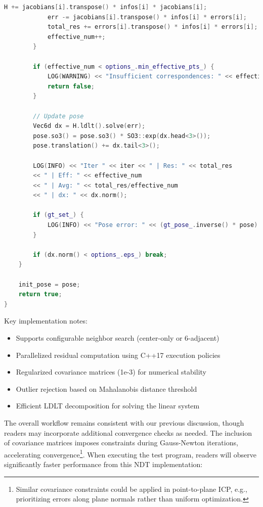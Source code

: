 \begin{lstlisting}[language=c++,caption=src/ch7/ndt\_3d.cc]
			H += jacobians[i].transpose() * infos[i] * jacobians[i];
			err -= jacobians[i].transpose() * infos[i] * errors[i];
			total_res += errors[i].transpose() * infos[i] * errors[i];
			effective_num++;
		}
		
		if (effective_num < options_.min_effective_pts_) {
			LOG(WARNING) << "Insufficient correspondences: " << effective_num;
			return false;
		}
		
		// Update pose
		Vec6d dx = H.ldlt().solve(err);
		pose.so3() = pose.so3() * SO3::exp(dx.head<3>());
		pose.translation() += dx.tail<3>();
		
		LOG(INFO) << "Iter " << iter << " | Res: " << total_res 
		<< " | Eff: " << effective_num
		<< " | Avg: " << total_res/effective_num
		<< " | dx: " << dx.norm();
		
		if (gt_set_) {
			LOG(INFO) << "Pose error: " << (gt_pose_.inverse() * pose).log().norm();
		}
		
		if (dx.norm() < options_.eps_) break;
	}
	
	init_pose = pose;
	return true;
}
\end{lstlisting}

Key implementation notes:
\begin{itemize}
	\item Supports configurable neighbor search (center-only or 6-adjacent)
	\item Parallelized residual computation using C++17 execution policies
	\item Regularized covariance matrices (1e-3) for numerical stability
	\item Outlier rejection based on Mahalanobis distance threshold
	\item Efficient LDLT decomposition for solving the linear system
\end{itemize}

The overall workflow remains consistent with our previous discussion, though readers may incorporate additional convergence checks as needed. The inclusion of covariance matrices imposes constraints during Gauss-Newton iterations, accelerating convergence\footnote{Similar covariance constraints could be applied in point-to-plane ICP, e.g., prioritizing errors along plane normals rather than uniform optimization.}. When executing the test program, readers will observe significantly faster performance from this NDT implementation:

